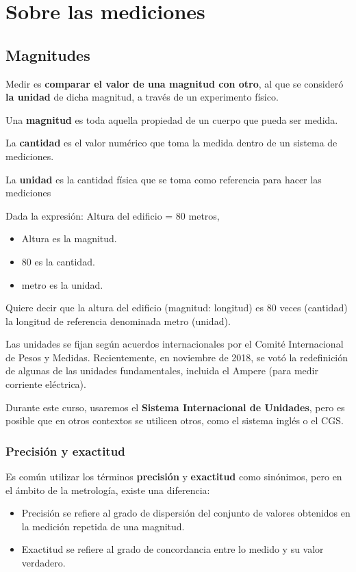 \chapter{Sobre las mediciones}
\section{Magnitudes}
Medir es \textbf{comparar el valor de una magnitud con otro}, al que se consideró \textbf{la unidad} de dicha magnitud, a través de un experimento físico.

Una \textbf{magnitud} es toda aquella propiedad de un cuerpo que pueda ser medida.

La \textbf{cantidad} es el valor numérico que toma la medida dentro de un sistema de mediciones.

La \textbf{unidad} es la cantidad física que se toma como referencia para hacer las mediciones

\begin{ejemplo}
	Dada la expresión: Altura del edificio = 80 metros,
	\begin{itemize}
		\item Altura es la magnitud.
		\item 80 es la cantidad.
		\item metro es la unidad.
	\end{itemize}
	
	Quiere decir que la altura del edificio (magnitud: longitud) es 80 veces (cantidad) la longitud de referencia denominada metro (unidad).
\end{ejemplo}

Las unidades se fijan según acuerdos internacionales por el Comité Internacional de Pesos y Medidas. Recientemente, en noviembre de 2018, se votó la redefinición de algunas de las unidades fundamentales, incluida el Ampere (para medir corriente eléctrica).

Durante este curso, usaremos el \textbf{Sistema Internacional de Unidades}, pero es posible que en otros contextos se utilicen otros, como el sistema inglés o el CGS.
\subsection{Precisión y exactitud}
	Es común utilizar los términos \textbf{precisión} y \textbf{exactitud} como sinónimos, pero en el ámbito de la metrología, existe una diferencia:
	\begin{itemize}
		\item Precisión se refiere al grado de dispersión del conjunto de valores obtenidos en la medición repetida de una magnitud.
		\item Exactitud se refiere al grado de concordancia entre lo medido y su valor verdadero.
	\end{itemize}
